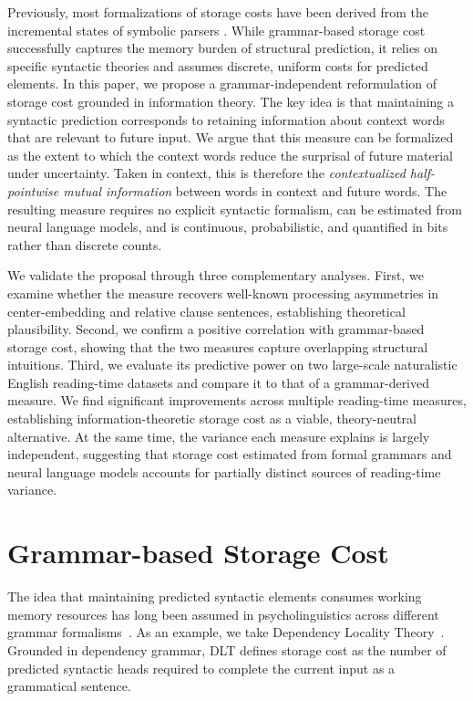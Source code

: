 \documentclass[11pt]{article}
\begin{document}
Previously, most formalizations of storage costs have been derived from the incremental states of symbolic parsers \citep[e.g.,][]{gibson-2000}.
While grammar-based storage cost successfully captures the memory burden of structural prediction, it relies on specific syntactic theories and assumes discrete, uniform costs for predicted elements.
In this paper, we propose a grammar-independent reformulation of storage cost grounded in information theory.
The key idea is that maintaining a syntactic prediction corresponds to retaining information about context words that are relevant to future input.
We argue that this measure can be formalized as the extent to which the context words reduce the surprisal of future material under uncertainty.
Taken in context, this is therefore the \emph{contextualized half-pointwise mutual information} between words in context and future words.
The resulting measure requires no explicit syntactic formalism, can be estimated from neural language models, and is continuous, probabilistic, and quantified in bits rather than discrete counts.



We validate the proposal through three complementary analyses.
First, we examine whether the measure recovers well-known processing asymmetries in center-embedding and relative clause sentences, establishing theoretical plausibility.
Second, we confirm a positive correlation with grammar-based storage cost, showing that the two measures capture overlapping structural intuitions.
Third, we evaluate its predictive power on two large-scale naturalistic English reading-time datasets and compare it to that of a grammar-derived measure.
We find significant improvements across multiple reading-time measures, establishing information-theoretic storage cost as a viable, theory-neutral alternative.
At the same time, the variance each measure explains is largely independent, suggesting that storage cost estimated from formal grammars and neural language models accounts for partially distinct sources of reading-time variance.



\section{Grammar-based Storage Cost}
\label{sec:background}

The idea that maintaining predicted syntactic elements consumes working memory resources has long been assumed in psycholinguistics across different grammar formalisms~\citep{yngve-1960,miller-chomsky-1963,abney-johnson-1991,rambow-joshi-1994,gibson-1998,gibson-2000,kobele-etal-2013,isono-2024}.
As an example, we take Dependency Locality Theory~\citep[DLT;][]{gibson-2000}.
Grounded in dependency grammar, DLT defines storage cost as the number of predicted syntactic heads required to complete the current input as a grammatical sentence.
\end{document}
